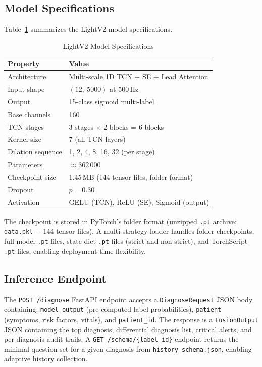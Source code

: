\documentclass[journal]{IEEEtran}
\begin{document}
\subsection{Model Specifications}

Table~\ref{tab:model_spec} summarizes the LightV2 model
specifications.

\begin{table}[!t]
\centering
\caption{LightV2 Model Specifications}
\label{tab:model_spec}
\begin{tabular}{@{}ll@{}}
  \toprule
  Property & Value \\
  \midrule
  Architecture       & Multi-scale 1D TCN + SE + Lead Attention \\
  Input shape        & $(12,\ 5000)$ at 500\,Hz \\
  Output             & 15-class sigmoid multi-label \\
  Base channels      & 160 \\
  TCN stages         & 3 stages $\times$ 2 blocks = 6 blocks \\
  Kernel size        & 7 (all TCN layers) \\
  Dilation sequence  & 1, 2, 4, 8, 16, 32 (per stage) \\
  Parameters         & ${\approx}362\,000$ \\
  Checkpoint size    & 1.45\,MB (144 tensor files, folder format) \\
  Dropout            & $p{=}0.30$ \\
  Activation         & GELU (TCN), ReLU (SE), Sigmoid (output) \\
  \bottomrule
\end{tabular}
\end{table}

The checkpoint is stored in PyTorch's folder format
(unzipped \texttt{.pt} archive: \texttt{data.pkl} + 144 tensor files).
A multi-strategy loader handles folder checkpoints, full-model
\texttt{.pt} files, state-dict \texttt{.pt} files (strict and
non-strict), and TorchScript \texttt{.pt} files, enabling
deployment-time flexibility.

\subsection{Inference Endpoint}

The \texttt{POST /diagnose} FastAPI endpoint accepts a
\texttt{DiagnoseRequest} JSON body containing:
\texttt{model\_output} (pre-computed label probabilities),
\texttt{patient} (symptoms, risk factors, vitals), and
\texttt{patient\_id}.
The response is a \texttt{FusionOutput} JSON containing
the top diagnosis, differential diagnosis list, critical alerts,
and per-diagnosis audit trails.
A \texttt{GET /schema/\{label\_id\}} endpoint returns the minimal
question set for a given diagnosis from
\texttt{history\_schema.json}, enabling adaptive history collection.
\end{document}
